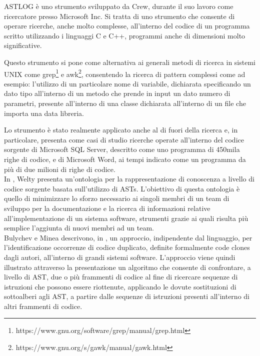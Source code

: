 ASTLOG è uno strumento sviluppato da Crew, durante il suo lavoro come
ricercatore presso Microsoft Inc. Si tratta di uno strumento che consente di
operare ricerche, anche molto complesse, all’interno del codice di un programma
scritto utilizzando i linguaggi C e C++, programmi anche di dimensioni molto
significative. \cite{DBLP:conf/dsl/Crew97}

Questo strumento si pone come alternativa ai generali metodi di ricerca in
sistemi UNIX come
grep\footnote{https://www.gnu.org/software/grep/manual/grep.html} e
awk\footnote{https://www.gnu.org/s/gawk/manual/gawk.html}, consentendo la
ricerca di pattern complessi come ad esempio: l’utilizzo di un particolare nome
di variabile, dichiarata specificando un dato tipo all’interno di un metodo che
prende in input un dato numero di parametri, presente all’interno di una classe
dichiarata all’interno di un file che importa una data libreria.

Lo strumento è stato realmente applicato anche al di fuori della ricerca e, in
particolare, \cite{DBLP:conf/dsl/Crew97} presenta come casi di studio ricerche
operate all’interno del codice sorgente di Microsoft SQL Server, descritto come
uno programma di 450mila righe di codice, e di Microsoft Word, ai tempi indicato
come un programma da più di due milioni di righe di codice.\\

In \cite{DBLP:conf/kbse/Welty97}, Welty presenta un’ontologia per la
rappresentazione di conoscenza a livello di codice sorgente basata sull’utilizzo
di ASTs. L’obiettivo di questa ontologia è quello di minimizzare lo sforzo
necessario ai singoli membri di un team di sviluppo per la documentazione e la
ricerca di informazioni relative all’implementazione di un sistema software,
strumenti grazie ai quali risulta più semplice l’aggiunta di nuovi membri ad un
team.\\

Bulychev e Minea descrivono, in \cite{peter2008duplicate}, un approccio,
indipendente dal linguaggio, per l’identificazione occorrenze di codice
duplicato, definite formalmente code clones dagli autori, all’interno di grandi
sistemi software. L’approccio viene quindi illustrato attraverso la
presentazione un algoritmo che consente di confrontare, a livello di AST, due o
più frammenti di codice al fine di ricercare sequenze di istruzioni che possono
essere riottenute, applicando le dovute sostituzioni di sottoalberi agli AST, a
partire dalle sequenze di istruzioni presenti all’interno di altri frammenti di
codice.\\

